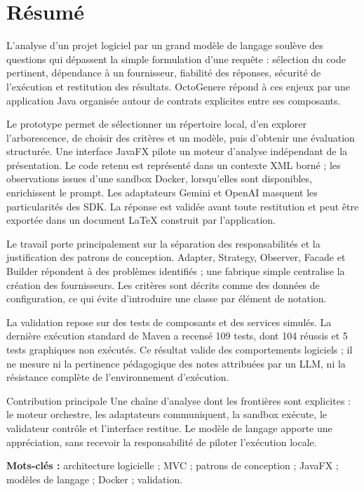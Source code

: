 \section*{Résumé}
L'analyse d'un projet logiciel par un grand modèle de langage soulève des questions qui dépassent la simple formulation d'une requête : sélection du code pertinent, dépendance à un fournisseur, fiabilité des réponses, sécurité de l'exécution et restitution des résultats. OctoGenere répond à ces enjeux par une application Java organisée autour de contrats explicites entre ses composants.

Le prototype permet de sélectionner un répertoire local, d'en explorer l'arborescence, de choisir des critères et un modèle, puis d'obtenir une évaluation structurée. Une interface JavaFX pilote un moteur d'analyse indépendant de la présentation. Le code retenu est représenté dans un contexte XML borné ; les observations issues d'une sandbox Docker, lorsqu'elles sont disponibles, enrichissent le prompt. Les adaptateurs Gemini et OpenAI masquent les particularités des SDK. La réponse est validée avant toute restitution et peut être exportée dans un document LaTeX construit par l'application.

Le travail porte principalement sur la séparation des responsabilités et la justification des patrons de conception. Adapter, Strategy, Observer, Facade et Builder répondent à des problèmes identifiés ; une fabrique simple centralise la création des fournisseurs. Les critères sont décrits comme des données de configuration, ce qui évite d'introduire une classe par élément de notation.

La validation repose sur des tests de composants et des services simulés. La dernière exécution standard de Maven a recensé 109 tests, dont 104 réussis et 5 tests graphiques non exécutés. Ce résultat valide des comportements logiciels ; il ne mesure ni la pertinence pédagogique des notes attribuées par un LLM, ni la résistance complète de l'environnement d'exécution.

\begin{pointcle}{Contribution principale}
Une chaîne d'analyse dont les frontières sont explicites : le moteur orchestre, les adaptateurs communiquent, la sandbox exécute, le validateur contrôle et l'interface restitue. Le modèle de langage apporte une appréciation, sans recevoir la responsabilité de piloter l'exécution locale.
\end{pointcle}

\textbf{Mots-clés :} architecture logicielle ; MVC ; patrons de conception ; JavaFX ; modèles de langage ; Docker ; validation.

